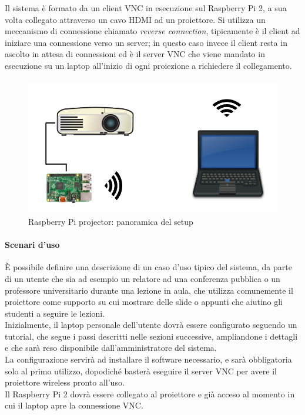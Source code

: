 Il sistema è formato da un client VNC in esecuzione sul Raspberry Pi 2, a sua volta collegato attraverso un cavo HDMI ad un proiettore.  Si utilizza un meccanismo di connessione chiamato \textit{reverse connection}, tipicamente è il client ad iniziare una connessione verso un server; in questo caso invece il client resta in ascolto in attesa di connessioni ed è il server VNC che viene mandato in esecuzione su un laptop all'inizio di ogni proiezione a richiedere il collegamento.

\begin{figure}[h!]
\includegraphics[width=12cm, height=6cm]{../img/setup}
\centering
\caption{Raspberry Pi projector: panoramica del setup}
\end{figure}

\paragraph{Scenari d'uso}
È possibile definire una descrizione di un caso d'uso tipico del sistema, da parte di un utente che sia ad esempio un relatore ad una conferenza pubblica o un professore universitario durante una lezione in aula, che utilizza comunemente il proiettore come supporto su cui mostrare delle slide o appunti che aiutino gli studenti a seguire le lezioni.\\
Inizialmente, il laptop personale dell'utente dovrà essere configurato seguendo un tutorial, che segue i passi descritti nelle sezioni successive, ampliandone i dettagli e che sarà reso disponibile dall'amministratore del sistema.\\
La configurazione servirà ad installare il software necessario, e sarà obbligatoria solo al primo utilizzo, dopodiché basterà eseguire il server VNC per avere il proiettore wireless pronto all'uso.\\
Il Raspberry Pi 2 dovrà essere collegato al proiettore e già acceso al momento in cui il laptop apre la connessione VNC. \\

